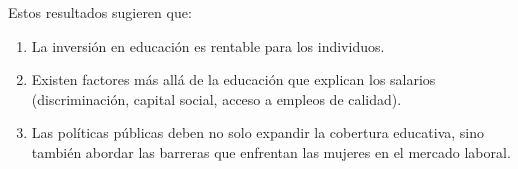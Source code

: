 \documentclass[12pt, a4paper]{article}
\begin{document}
Estos resultados sugieren que:
\begin{enumerate}
  \item La inversión en educación es rentable para los individuos.
  \item Existen factores más allá de la educación que explican los salarios 
        (discriminación, capital social, acceso a empleos de calidad).
  \item Las políticas públicas deben no solo expandir la cobertura educativa, 
        sino también abordar las barreras que enfrentan las mujeres en el 
        mercado laboral.
\end{enumerate}

\end{document}
